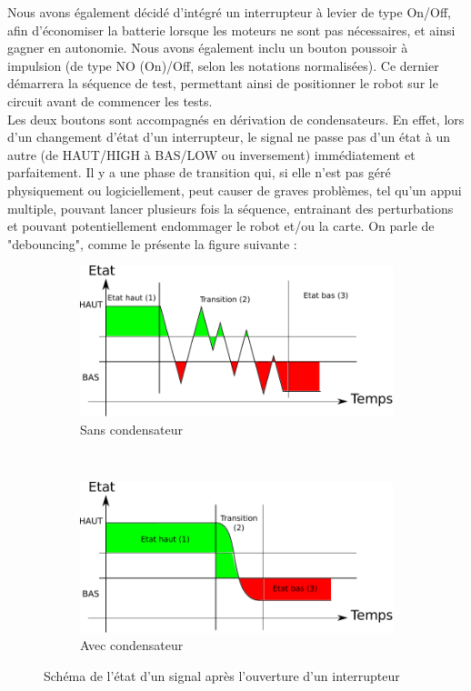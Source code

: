			Nous avons également décidé d'intégré un interrupteur à levier de type On/Off, afin d'économiser la batterie lorsque les moteurs ne sont pas nécessaires, et ainsi gagner en autonomie. Nous avons également inclu un bouton poussoir à impulsion (de type NO (On)/Off, selon les notations normalisées). Ce dernier démarrera la séquence de test, permettant ainsi de positionner le robot sur le circuit avant de commencer les tests.\\
			Les deux boutons sont accompagnés en dérivation de condensateurs. En effet, lors d'un changement d'état d'un interrupteur, le signal ne passe pas d'un état à un autre (de HAUT/HIGH à BAS/LOW ou inversement) immédiatement et parfaitement. Il y a une phase de transition qui, si elle n'est pas géré physiquement ou logiciellement, peut causer de graves problèmes, tel qu'un appui multiple, pouvant lancer plusieurs fois la séquence, entrainant des perturbations et pouvant potentiellement endommager le robot et/ou la carte. On parle de "debouncing", comme le présente la figure suivante :
			\begin{figure}[H]
				\centering
				\begin{subfigure}[h]{0.45\textwidth}
			        \includegraphics[width=\textwidth]{Graphics/btnNoDebounce.pdf}
			        \caption{Sans condensateur}
			    \end{subfigure}
			    ~
			    \begin{subfigure}[h]{0.45\textwidth}
			        \includegraphics[width=\textwidth]{Graphics/btnDebounce.pdf}
			        \caption{Avec condensateur}
			    \end{subfigure}
			    \caption{Schéma de l'état d'un signal après l'ouverture d'un interrupteur}
			\end{figure}
